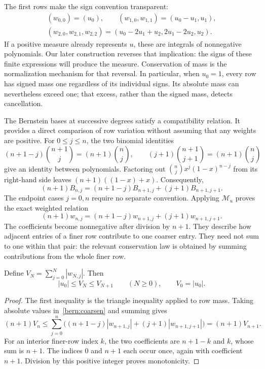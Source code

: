 The first rows make the sign convention transparent:
\[
 \begin{gathered}
 (w_{0,0})=(u_0),\qquad
 (w_{1,0},w_{1,1})=(u_0-u_1,u_1),\\
 (w_{2,0},w_{2,1},w_{2,2})=(u_0-2u_1+u_2,2u_1-2u_2,u_2).
 \end{gathered}
\]
If a positive measure already represents $u$, these are integrals of
nonnegative polynomials. Our later construction reverses that implication:
the signs of these finite expressions will produce the measure.
Conservation of mass is the normalization mechanism for that reversal.
In particular, when $u_0=1$, every row has signed mass one regardless
of its individual signs. Its absolute mass can nevertheless exceed one;
that excess, rather than the signed mass, detects cancellation.

\label{bern:coarsening-page}

The Bernstein bases at successive degrees satisfy a compatibility
relation. It provides a direct comparison of row variation without
assuming that any weights are positive. For $0\le j\le n$, the two
binomial identities
\[
 (n+1-j)\binom{n+1}{j}=(n+1)\binom nj,
 \qquad
 (j+1)\binom{n+1}{j+1}=(n+1)\binom nj
\]
give an identity between polynomials. Factoring out
$\binom njx^j(1-x)^{n-j}$ from its right-hand side leaves
$(n+1)((1-x)+x)$. Consequently,
\begin{equation}\label{bern:poly-coarsen}
 (n+1)B_{n,j}
 =(n+1-j)B_{n+1,j}+(j+1)B_{n+1,j+1}.
\end{equation}
The endpoint cases $j=0,n$ require no separate convention. Applying
$\mathcal M_u$ proves the exact weighted relation
\begin{equation}\label{bern:coarsen}
 (n+1)w_{n,j}
 =(n+1-j)w_{n+1,j}+(j+1)w_{n+1,j+1}.
\end{equation}
The coefficients become nonnegative after division by $n+1$.
They describe how adjacent entries of a finer row contribute to one
coarser entry. They need not sum to one within that pair: the relevant
conservation law is obtained by summing contributions from the whole
finer row.

\begin{proposition}\label{bern:variation}
Define $V_N=\sum_{j=0}^N|w_{N,j}|$. Then
\[
 |u_0|\le V_N\le V_{N+1}\qquad(N\ge0),
 \qquad V_0=|u_0|.
\]
\end{proposition}
\begin{proof}
The first inequality is the triangle inequality applied to row mass.
Taking absolute values in~\eqref{bern:coarsen} and summing gives
\[
 (n+1)V_n\le
 \sum_{j=0}^n\bigl((n+1-j)|w_{n+1,j}|
                  +(j+1)|w_{n+1,j+1}|\bigr)
 =(n+1)V_{n+1}.
\]
For an interior finer-row index $k$, the two coefficients are
$n+1-k$ and $k$, whose sum is $n+1$. The indices $0$ and $n+1$
each occur once, again with coefficient $n+1$. Division by this
positive integer proves monotonicity.
\end{proof}


